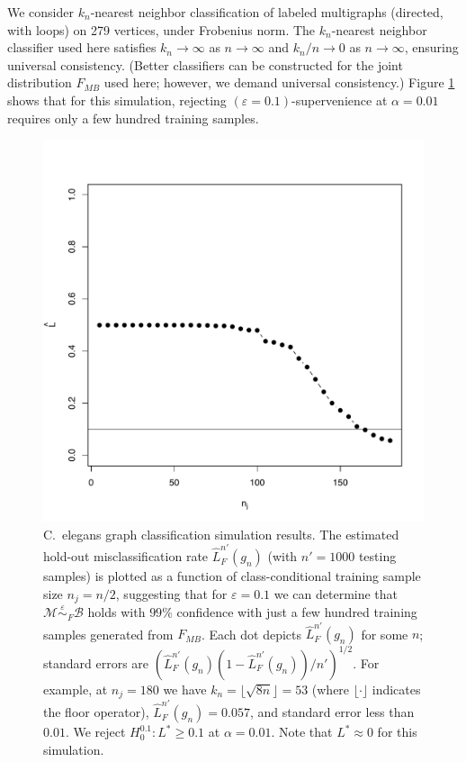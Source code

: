 \documentclass{article}
\newcommand{\PP}{\mathbb{P}}
\providecommand{\mt}[1]{\widetilde{#1}}
\newcommand{\eps}{\varepsilon}
\newcommand{\mB}{\mathcal{B}}
\newcommand{\mM}{\mathcal{M}}
\newcommand{\hL}{\widehat{L}}
\newcommand{\MeB}{\mM \overset{\varepsilon}{{\sim}}_{F} \mB}
\begin{document}

We consider $k_n$-nearest neighbor classification of labeled multigraphs (directed, with loops) on 279 vertices, under Frobenius norm. The $k_n$-nearest neighbor classifier used here satisfies $k_n \rightarrow \infty$ as $n \rightarrow \infty$ and $k_n/n \rightarrow 0$ as $n \rightarrow \infty$, ensuring universal consistency. (Better classifiers can be constructed for the joint distribution $F_{MB}$ used here; however, we demand universal consistency.)  Figure \ref{fig:1} shows that for this simulation, rejecting $(\eps=0.1)$-supervenience at $\alpha=0.01$ requires only a few hundred training samples.





\begin{figure}[!ht]
\centering 
\includegraphics[width=.5\linewidth]{Lhatplot}
\caption{C.~elegans graph classification simulation results.  The estimated hold-out misclassification rate $\hL^{n'}_{F}(g_{n})$  (with $n'=1000$ testing samples) %
is plotted as a function of class-conditional training sample size $n_j=n/2$, suggesting that for $\varepsilon=0.1$ we can determine that $\MeB$ holds with $99\%$ confidence with just a few hundred training samples generated from $F_{MB}$. Each dot depicts $\hL^{n'}_{F}(g_n)$ for some $n$; standard errors are $(\hL^{n'}_{F}(g_{n}) (1-\hL^{n'}_{F}(g_{n}))/n')^{1/2}$.  For example, at $n_j = 180$ we have $k_n = \lfloor\sqrt{8 n}\rfloor=53$ (where $\lfloor\cdot\rfloor$ indicates the floor operator), $\hL^{n'}_{F}(g_{n}) = 0.057$, and standard error less than $0.01$. We reject $H_0^{0.1}: L^* \geq 0.1$ at $\alpha=0.01$. Note that $L^* \approx 0$ for this simulation.}
\label{fig:1}
\end{figure}
\end{document}
